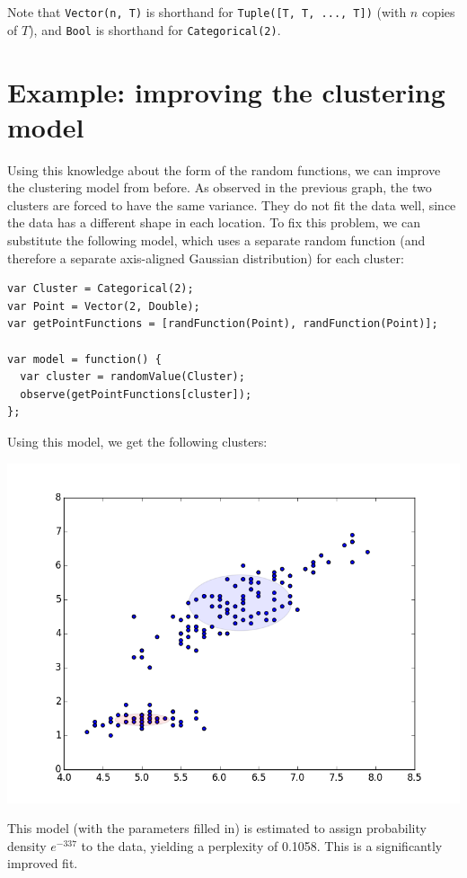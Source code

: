 \documentclass{article}
\begin{document}
  Note that \texttt{Vector(n, T)} is shorthand for \texttt{Tuple([T, T, ..., T])} (with $n$ copies of $T$),
  and \texttt{Bool} is shorthand for \texttt{Categorical(2)}.

  \section{Example: improving the clustering model}
  Using this knowledge about the form of the random functions, we can improve the clustering model from before.
  As observed in the previous graph, the two clusters are forced to have the
  same variance. They do not fit the data well, since the data has a different
  shape in each location.  To fix this problem, we can substitute the following
  model, which uses a separate random function (and therefore a separate axis-aligned Gaussian distribution) for each cluster:
  \begin{lstlisting}
var Cluster = Categorical(2);
var Point = Vector(2, Double);
var getPointFunctions = [randFunction(Point), randFunction(Point)];

var model = function() {
  var cluster = randomValue(Cluster);
  observe(getPointFunctions[cluster]);
};
\end{lstlisting}
  Using this model, we get the following clusters:
  \begin{center}
    \includegraphics[scale=0.5]{../plots/irisclusters_indep.png}
  \end{center}
  This model (with the parameters filled in) is estimated to assign probability density $e^{-337}$ to the data, yielding a perplexity of 0.1058.  This is a significantly improved fit.
\end{document}
